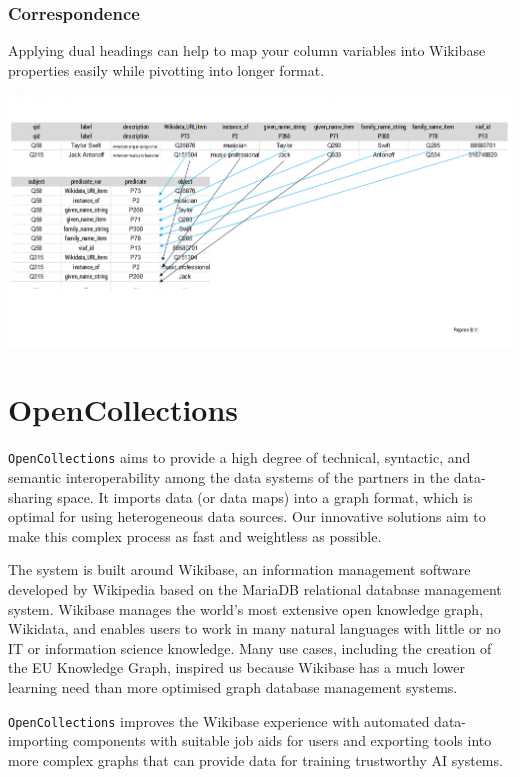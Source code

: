 \documentclass[
  letterpaper,
  DIV=11,
  numbers=noendperiod]{scrreprt}
\begin{document}
\subsection{Correspondence}\label{correspondence}

Applying dual headings can help to map your column variables into
Wikibase properties easily while pivotting into longer format.

\begin{center}
\includegraphics{png/tidy/pivot_longer_to_statements_dual_heading_notitle_2x1.png}
\end{center}


\chapter{OpenCollections}\label{opencollections}

\texttt{OpenCollections} aims to provide a high degree of technical,
syntactic, and semantic interoperability among the data systems of the
partners in the data-sharing space. It imports data (or data maps) into
a graph format, which is optimal for using heterogeneous data sources.
Our innovative solutions aim to make this complex process as fast and
weightless as possible.

The system is built around Wikibase, an information management software
developed by Wikipedia based on the MariaDB relational database
management system. Wikibase manages the world's most extensive open
knowledge graph, Wikidata, and enables users to work in many natural
languages with little or no IT or information science knowledge. Many
use cases, including the creation of the EU Knowledge Graph, inspired us
because Wikibase has a much lower learning need than more optimised
graph database management systems.

\texttt{OpenCollections} improves the Wikibase experience with automated
data-importing components with suitable job aids for users and exporting
tools into more complex graphs that can provide data for training
trustworthy AI systems.
\end{document}
